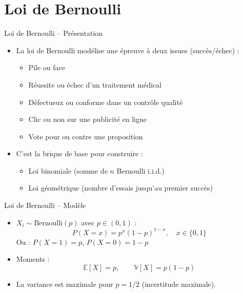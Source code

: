 \documentclass[11pt,aspectratio=169]{beamer}
\begin{document}
\section{Loi de Bernoulli}

\begin{frame}{Loi de Bernoulli -- Présentation}

\begin{itemize}

\item La loi de Bernoulli modélise une épreuve à deux issues (succès/échec) :\newline
  \begin{itemize}
    \item Pile ou face\newline
    \item Réussite ou échec d'un traitement médical\newline
    \item Défectueux ou conforme dans un contrôle qualité\newline
    \item Clic ou non sur une publicité en ligne\newline
    \item Vote pour ou contre une proposition\newline
  \end{itemize}

\item C'est la brique de base pour construire :\newline
  \begin{itemize}
    \item Loi binomiale (somme de $n$ Bernoulli i.i.d.)\newline
    \item Loi géométrique (nombre d'essais jusqu'au premier succès)
  \end{itemize}

\end{itemize}

\end{frame}

\begin{frame}{Loi de Bernoulli -- Modèle}

\begin{itemize}

\item $X_i \sim \text{Bernoulli}(p)$ avec $p \in (0,1)$ :
  \[
  P(X = x) = p^x (1-p)^{1-x}, \quad x \in \{0, 1\}
  \]
  Ou : $P(X = 1) = p$, $P(X = 0) = 1 - p$\newline

\item Moments :
  \[
  \mathbb{E}[X] = p, \qquad \mathbb{V}[X] = p(1-p)
  \]

\item La variance est maximale pour $p = 1/2$ (incertitude maximale).

\end{itemize}

\end{frame}
\end{document}
